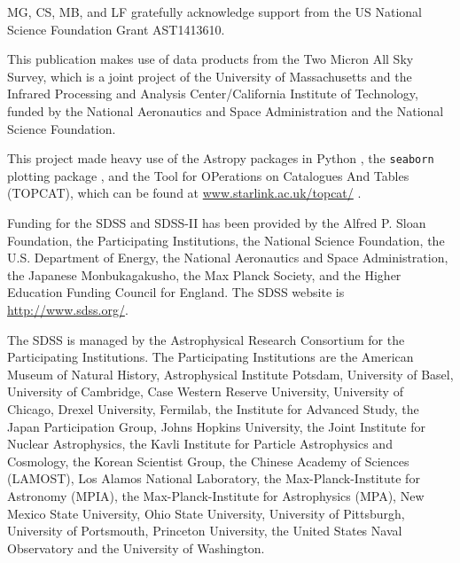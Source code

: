 \documentclass[useAMS,usenatbib]{mn2e}
\begin{document}
MG, CS, MB, and LF gratefully acknowledge support from the US National
Science Foundation Grant AST1413610.

This publication makes use of data products from the Two Micron All Sky Survey, which is a joint project of the University of Massachusetts and the Infrared Processing and Analysis Center/California Institute of Technology, funded by the National Aeronautics and Space Administration and the National Science Foundation.

This project made heavy use of the Astropy packages in Python \citep{Robitaille2013}, the \texttt{seaborn} plotting package \citep{Waskom}, and the Tool for OPerations on Catalogues And Tables (TOPCAT), which can be found at \url{www.starlink.ac.uk/topcat/} \citep{Taylor2005}. 

Funding for the SDSS and SDSS-II has been provided by the Alfred P. Sloan
Foundation, the Participating Institutions, the National Science Foundation,
the U.S. Department of Energy, the National Aeronautics and Space
Administration, the Japanese Monbukagakusho, the Max Planck Society, and the
Higher Education Funding Council for England. The SDSS website is
\url{http://www.sdss.org/}. 

The SDSS is managed by the Astrophysical Research Consortium for the
Participating Institutions. The Participating Institutions are the American
Museum of Natural History, Astrophysical Institute Potsdam, University of
Basel, University of Cambridge, Case Western Reserve University, University of
Chicago, Drexel University, Fermilab, the Institute for Advanced Study, the
Japan Participation Group, Johns Hopkins University, the Joint Institute for
Nuclear Astrophysics, the Kavli Institute for Particle Astrophysics and
Cosmology, the Korean Scientist Group, the Chinese Academy of Sciences
(LAMOST), Los Alamos National Laboratory, the Max-Planck-Institute for
Astronomy (MPIA), the Max-Planck-Institute for Astrophysics (MPA), New Mexico
State University, Ohio State University, University of Pittsburgh, University
of Portsmouth, Princeton University, the United States Naval Observatory and
the University of Washington. 


  
\end{document}
